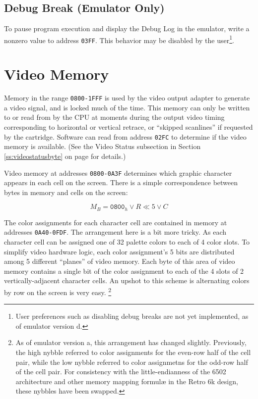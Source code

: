 \documentclass[12pt]{{memoir}}
\begin{document}
\subsection{Debug Break (Emulator Only)}

To pause program execution and display the Debug Log in the emulator, write a nonzero value to address \texttt{03FF}. This behavior may be disabled by the user\footnote{User preferences such as disabling debug breaks are not yet implemented, as of emulator version d.}.

\section{Video Memory}
\label{sec:videomem}

Memory in the range \texttt{0800-1FFF} is used by the video output adapter to generate a video signal, and is locked much of the time. This memory can only be written to or read from by the CPU at moments during the output video timing corresponding to horizontal or vertical retrace, or ``skipped scanlines'' if requested by the cartridge. Software can read from address \texttt{02FC} to determine if the video memory is available. (See the Video Status subsection in Section \ref{ss:videostatusbyte} on page \pageref{ss:videostatusbyte} for details.)

Video memory at addresses \texttt{0800-0A3F} determines which graphic character appears in each cell on the screen. There is a simple correspondence between bytes in memory and cells on the screen:

$$M_B = \texttt{0800}_h \vee  R \ll 5 \vee C$$

The color assignments for each character cell are contained in memory at addresses \texttt{0A40-0FDF}. The arrangement here is a bit more tricky. As each character cell can be assigned one of 32 palette colors to each of 4 color slots. To simplify video hardware logic, each color assignment's 5 bits are distributed among 5 different ``planes'' of video memory. Each byte of this area of video memory contains a single bit of the color assignment to each of the 4 slots of 2 vertically-adjacent character cells. An upshot to this scheme is alternating colors by row on the screen is very easy. \footnote{As of emulator version a, this arrangement has changed slightly. Previously, the high nybble referred to color assignments for the even-row half of the cell pair, while the low nybble referred to color assignmetns for the odd-row half of the cell pair. For consistency with the little-endianness of the 6502 architecture and other memory mapping formul\ae{} in the Retro 6k design, these nybbles have been swapped.}
\end{document}

